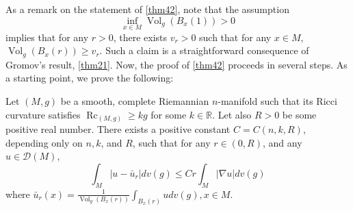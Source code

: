 \documentclass[12pt,hyperref,a4paper,UTF8]{ctexart}
\begin{document}
As a remark on the statement of \autoref{thm42}, note that the assumption
$$
\inf _{x \in M} \operatorname{Vol}_g\left(B_x(1)\right)>0
$$
implies that for any $r>0$, there exists $v_r>0$ such that for any $x \in M$, $\operatorname{Vol}_g\left(B_x(r)\right) \geq v_r$. Such a claim is a straightforward consequence of Gromov's result, \autoref{thm21}. Now, the proof of \autoref{thm42} proceeds in several steps. As a starting point, we prove the following:

\begin{Lemma}
Let $(M, g)$ be a smooth, complete Riemannian $n$-manifold such that its Ricci curvature satisfies $\operatorname{Rc}_{(M, g)} \geq k g$ for some $k \in \mathbb{R}$. Let also $R>0$ be some positive real number. There exists a positive constant $C=C(n, k, R)$, depending only on $n, k$, and $R$, such that for any $r \in(0, R)$, and any $u \in \mathcal{D}(M)$,
$$
\int_M\left|u-\bar{u}_r\right| d v(g) \leq C r \int_M|\nabla u| d v(g)
$$
where $\bar{u}_r(x)=\frac{1}{\operatorname{Vol}_g\left(B_x(r)\right)} \int_{B_x(r)} u d v(g), x \in M$.
\label{lem41}
\end{Lemma}
\end{document}
